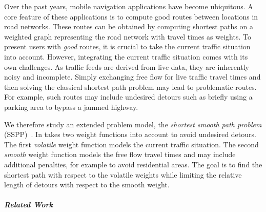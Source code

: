 \documentclass[a4paper,UKenglish,cleveref, autoref, thm-restate]{lipics-v2021}
\begin{document}
Over the past years, mobile navigation applications have become ubiquitous.
A core feature of these applications is to compute good routes between locations in road networks.
These routes can be obtained by computing shortest paths on a weighted graph representing the road network with travel times as weights.
To present users with \emph{good} routes, it is crucial to take the current traffic situation into account.
However, integrating the current traffic situation comes with its own challenges.
As traffic feeds are derived from live data, they are inherently noisy and incomplete.
Simply exchanging free flow for live traffic travel times and then solving the classical shortest path problem may lead to problematic routes.
For example, such routes may include undesired detours such as briefly using a parking area to bypass a jammed highway.

We therefore study an extended problem model, the \emph{shortest smooth path problem} (SSPP)~\cite{dss-tarrn-18}.
In takes two weight functions into account to avoid undesired detours.
The first \emph{volatile} weight function models the current traffic situation.
The second \emph{smooth} weight function models the free flow travel times and may include additional penalties, for example to avoid residential areas.
The goal is to find the shortest path with respect to the volatile weights while limiting the relative length of detours with respect to the smooth weight.

\subparagraph{Related Work}
\end{document}

